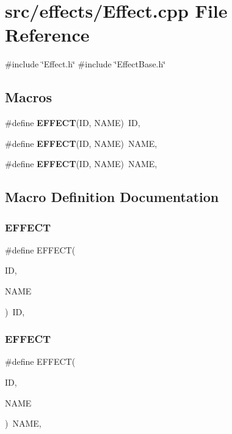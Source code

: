 \section{src/effects/\+Effect.cpp File Reference}
\label{_effect_8cpp}
{\ttfamily \#include \char`\"{}Effect.\+h\char`\"{}}\newline
{\ttfamily \#include \char`\"{}Effect\+Base.\+h\char`\"{}}\newline
\subsection*{Macros}
\begin{DoxyCompactItemize}
\item 
\#define \textbf{ E\+F\+F\+E\+CT}(ID,  N\+A\+ME)~ID,
\item 
\#define \textbf{ E\+F\+F\+E\+CT}(ID,  N\+A\+ME)~N\+A\+ME,
\item 
\#define \textbf{ E\+F\+F\+E\+CT}(ID,  N\+A\+ME)~N\+A\+ME,
\end{DoxyCompactItemize}


\subsection{Macro Definition Documentation}
\mbox{\label{_effect_8cpp_a9240be8adb787561095bcda2f39fce9b}} 
\subsubsection{E\+F\+F\+E\+CT\hspace{0.1cm}{\footnotesize\ttfamily [1/3]}}
{\footnotesize\ttfamily \#define E\+F\+F\+E\+CT(\begin{DoxyParamCaption}\item[{}]{ID,  }\item[{}]{N\+A\+ME }\end{DoxyParamCaption})~ID,}

\mbox{\label{_effect_8cpp_a9240be8adb787561095bcda2f39fce9b}} 
\subsubsection{E\+F\+F\+E\+CT\hspace{0.1cm}{\footnotesize\ttfamily [2/3]}}
{\footnotesize\ttfamily \#define E\+F\+F\+E\+CT(\begin{DoxyParamCaption}\item[{}]{ID,  }\item[{}]{N\+A\+ME }\end{DoxyParamCaption})~N\+A\+ME,}

